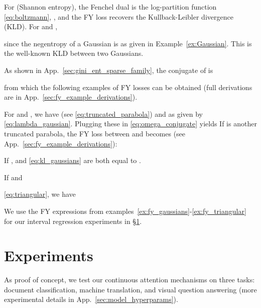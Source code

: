 \documentclass{article}
\newcommand{\remove}[1]{}
\begin{document}
{\begin{example}\label{ex:fy_gaussians} For  (Shannon entropy), the Fenchel dual is the log-partition function  \eqref{eq:boltzmann}, , and the FY loss recovers the  Kullback-Leibler divergence (KLD).  
For  and , 

since the negentropy of a Gaussian is as given in Example~\ref{ex:Gaussian}. This is the well-known KLD between two Gaussians.
\end{example}






As shown in App.~\ref{sec:gini_ent_sparse_family}, 
the conjugate of  is

from which the following examples of FY losses can be obtained (full derivations are in App.~\ref{sec:fy_example_derivations}).



\begin{example} For  and , we have (see \eqref{eq:truncated_parabola})  and  as given by \eqref{eq:lambda_gaussian}. Plugging these in \eqref{eq:omega_conjugate} yields 
If  is another truncated parabola, the FY loss between  and  becomes (see App.~\ref{sec:fy_example_derivations}):

If ,   and \eqref{eq:kl_gaussians} are both equal to .

\end{example}



\begin{example}\label{ex:fy_triangular}
If   and 

\eqref{eq:triangular}, we have

\end{example}

We use the FY expressions from examples~\ref{ex:fy_gaussians}-\ref{ex:fy_triangular} for our interval regression experiments in \S\ref{sec:experiments}.
}


\section{Experiments}\label{sec:experiments}

As proof of concept, we test our continuous attention mechanisms on three tasks: document classification, machine translation, and visual question answering (more experimental details in App.~\ref{sec:model_hyperparams}). 


\remove{
\subsection{Continuous attention mechanisms}
}
\end{document}

